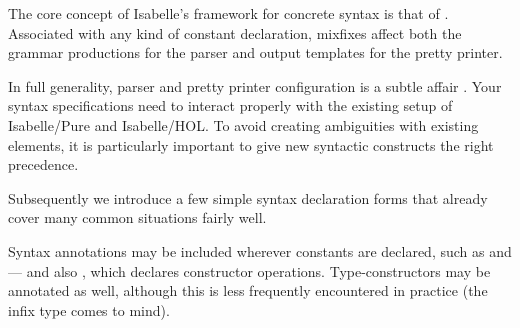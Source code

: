 %
\begin{isabellebody}%
\def\isabellecontext{Documents}%
\isamarkupfalse%
%
\isamarkuptrue%
%
\begin{isamarkuptext}%
The core concept of Isabelle's framework for concrete syntax is that
  of .  Associated with any kind of
  constant declaration, mixfixes affect both the grammar productions
  for the parser and output templates for the pretty printer.

  In full generality, parser and pretty printer configuration is a
  subtle affair \cite{isabelle-ref}.  Your syntax specifications need
  to interact properly with the existing setup of Isabelle/Pure and
  Isabelle/HOL\@.  To avoid creating ambiguities with existing
  elements, it is particularly important to give new syntactic
  constructs the right precedence.

  \medskip Subsequently we introduce a few simple syntax declaration
  forms that already cover many common situations fairly well.%
\end{isamarkuptext}%
\isamarkuptrue%
%
\isamarkuptrue%
%
\begin{isamarkuptext}%
Syntax annotations may be included wherever constants are declared,
  such as  and  --- and also
  , which declares constructor operations.
  Type-constructors may be annotated as well, although this is less
  frequently encountered in practice (the infix type \isa{{\isasymtimes}} comes
  to mind).


\end{isamarkuptext}
\end{isabellebody}
